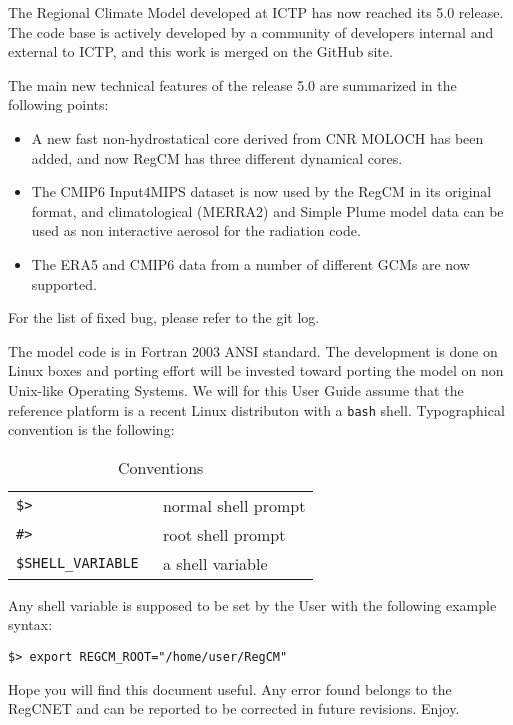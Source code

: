 %
%

The Regional Climate Model developed at ICTP has now reached its 5.0 release.
The code base is actively developed by a community of developers internal and
external to ICTP, and this work is merged on the GitHub site.

The main new technical features of the release 5.0 are summarized in the
following points:

\begin{itemize}
  \item A new fast non-hydrostatical core derived from CNR MOLOCH has
      been added, and now RegCM has three different dynamical cores.
  \item The CMIP6 Input4MIPS dataset is now used by the RegCM in its
      original format, and climatological (MERRA2) and Simple Plume model
      data can be used as non interactive aerosol for the radiation code.
  \item The ERA5 and CMIP6 data from a number of different GCMs are now
      supported.
\end{itemize}
For the list of fixed bug, please refer to the git log.

The model code is in Fortran 2003 ANSI standard.
The development is done on Linux boxes and porting effort will be invested
toward porting the model on non Unix-like Operating Systems.
We will for this User Guide assume that the reference platform is a recent
Linux distributon with a \verb=bash= shell.
Typographical convention is the following:

\begin{table}[ht]
\caption{Conventions}
\vspace{0.05 in}
\centering
\begin{tabular}{l|l}
\hline
\verb=$> = & normal shell prompt \\
\verb=#> = & root shell prompt \\
\verb=$SHELL_VARIABLE = & a shell variable \\
\hline
\end{tabular}
\label{conventions}
\end{table}

Any shell variable is supposed to be set by the User with the following example
syntax:

\begin{Verbatim}
$> export REGCM_ROOT="/home/user/RegCM"
\end{Verbatim}

Hope you will find this document useful. Any error found belongs to the
RegCNET and can be reported to be corrected in future revisions. Enjoy.
